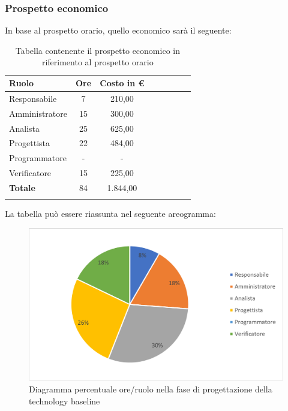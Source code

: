 			\subsubsection{Prospetto economico}
			In base al prospetto orario, quello economico sarà il seguente: 
			
			\begin{longtable}{|l|c|c|c|c|c|c|c|}
				\hline
				\rowcolor{lighter-grayer}
				\textbf{Ruolo} & \textbf{Ore} & \textbf{Costo in €} \\
				\hline
				\endfirsthead
				
				\hline
				Responsabile & 7 & 210,00\\
				\hline
				\hline
				Amministratore & 15 & 300,00\\
				\hline
				\hline
				Analista & 25 & 625,00\\
				\hline
				\hline
				Progettista & 22 & 484,00\\
				\hline
				\hline
				Programmatore & - & -\\
				\hline
				\hline
				Verificatore & 15 & 225,00\\
				\hline
				\hline
				\textbf{Totale} & 84 & 1.844,00\\
				\hline
				\rowcolor{white}
				\caption{Tabella contenente il prospetto economico in riferimento al prospetto orario}
			\end{longtable}
			\pagebreak
		
			La tabella può essere riassunta nel seguente areogramma:
			\begin{figure}[H]
				\centering
				\includegraphics[width=0.8\linewidth]{res/images/preventivo/3-2.png}
				\caption{Diagramma percentuale ore/ruolo nella fase di progettazione della technology baseline }
				\label{fig:diagramma costi ruolo fase progettazione della technology baseline }
            \end{figure}

